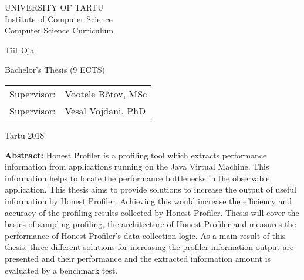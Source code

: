 \documentclass{style/thesis}
\begin{document}
\thispagestyle{empty}
\begin{center}

\large
UNIVERSITY OF TARTU\\[2mm]
Institute of Computer Science\\
Computer Science Curriculum\\[2mm]

\vspace{25mm}

\Large Tiit Oja

\vspace{4mm}

\huge \articleName

\vspace{20mm}

\Large Bachelor's Thesis (9 ECTS)

\end{center}

\vspace{2mm}

\begin{flushright}
 {
 \setlength{\extrarowheight}{5pt}
 \begin{tabular}{r l} 
  \sffamily Supervisor: & \sffamily Vootele Rõtov, MSc \\
  \sffamily Supervisor: & \sffamily Vesal Vojdani, PhD
 \end{tabular}
 }
\end{flushright}

\vfill
\centerline{Tartu 2018}


\pagebreak
{}%

\pagebreak

\noindent\textbf{\large \articleName}
\vspace*{0mm}

\textbf{Abstract:} Honest Profiler is a profiling tool which extracts performance information from applications running on the Java Virtual Machine. This information helps to locate the performance bottlenecks in the observable application. This thesis aims to provide solutions to increase the output of useful information by Honest Profiler. Achieving this would increase the efficiency and accuracy of the profiling results collected by Honest Profiler. Thesis will cover the basics of sampling profiling, the architecture of Honest Profiler and measures the performance of Honest Profiler's data collection logic. As a main result of this thesis, three different solutions for increasing the profiler information output are presented and their performance and the extracted information amount is evaluated by a benchmark test.
  
\end{document}
